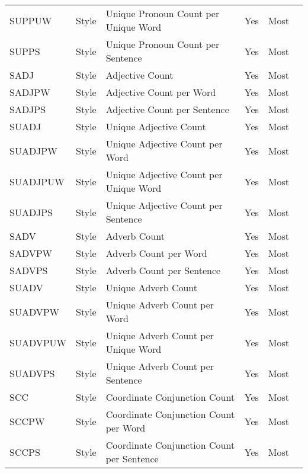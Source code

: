 \begin{longtable}{l l m{} c c m{}}
    SUPPUW & Style & Unique Pronoun Count per Unique Word & Yes & Most & \cite{Bassani2019_lr359} \\
    SUPPS & Style & Unique Pronoun Count per Sentence & Yes & Most & \cite{Bassani2019_lr359} \\
    SADJ & Style & Adjective Count & Yes & Most & \cite{Bassani2019_lr359} \\
    SADJPW & Style & Adjective Count per Word & Yes & Most & \cite{Bassani2019_lr359} \\
    SADJPS & Style & Adjective Count per Sentence & Yes & Most & \cite{Bassani2019_lr359} \\
    SUADJ & Style & Unique Adjective Count & Yes & Most & \cite{Lewoniewski2018_lr149, Bassani2019_lr359} \\
    SUADJPW & Style & Unique Adjective Count per Word & Yes & Most & \cite{Bassani2019_lr359} \\
    SUADJPUW & Style & Unique Adjective Count per Unique Word & Yes & Most & \cite{Bassani2019_lr359} \\
    SUADJPS & Style & Unique Adjective Count per Sentence & Yes & Most & \cite{Bassani2019_lr359} \\
    SADV & Style & Adverb Count & Yes & Most & \cite{Bassani2019_lr359} \\
    SADVPW & Style & Adverb Count per Word & Yes & Most & \cite{Bassani2019_lr359} \\
    SADVPS & Style & Adverb Count per Sentence & Yes & Most & \cite{Bassani2019_lr359} \\
    SUADV & Style & Unique Adverb Count & Yes & Most & \cite{Bassani2019_lr359} \\
    SUADVPW & Style & Unique Adverb Count per Word & Yes & Most & \cite{Bassani2019_lr359} \\
    SUADVPUW & Style & Unique Adverb Count per Unique Word & Yes & Most & \cite{Bassani2019_lr359} \\
    SUADVPS & Style & Unique Adverb Count per Sentence & Yes & Most & \cite{Bassani2019_lr359} \\
    SCC & Style & Coordinate Conjunction Count & Yes & Most & \cite{Bassani2019_lr359, Dalip2014_lr1004, Magalhaes2019_lr2028} \\
    SCCPW & Style & Coordinate Conjunction Count per Word & Yes & Most & \cite{Dalip2009_lr14, Anderka2012_lr17, Wang2020_lr26, Wang2019_lr74, Ferretti2012_lr115, Pereyra2019_lr147, Bassani2019_lr359, Dalip2011_lr1003} \\
    SCCPS & Style & Coordinate Conjunction Count per Sentence & Yes & Most & \cite{Xu2011_lr30, Bassani2019_lr359} \\

\end{longtable}
